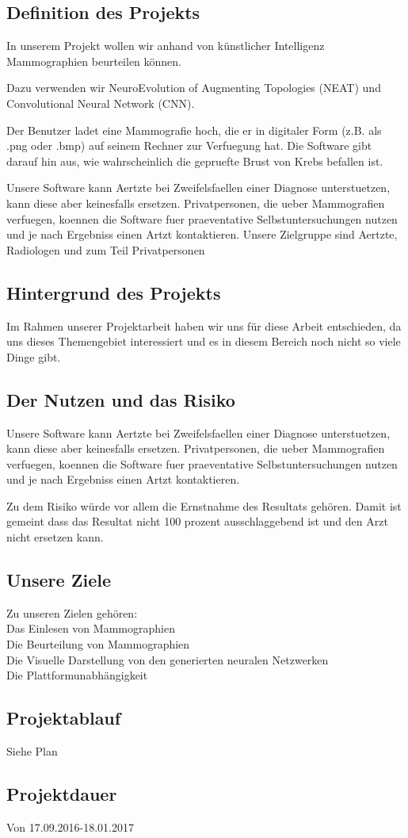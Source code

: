 \documentclass[11pt]{article}
\begin{document}
	\subsection{Definition des Projekts}
	In unserem Projekt wollen wir anhand von künstlicher Intelligenz Mammographien beurteilen können.
	
	Dazu verwenden wir NeuroEvolution of Augmenting Topologies (NEAT) und Convolutional Neural Network (CNN).
	
	Der Benutzer ladet eine Mammografie hoch, die er in digitaler Form (z.B. als
	.png oder .bmp) auf seinem Rechner zur Verfuegung hat. Die Software gibt
	darauf hin aus, wie wahrscheinlich die gepruefte Brust von Krebs befallen ist.
	
	Unsere Software kann Aertzte bei Zweifelsfaellen einer Diagnose unterstuetzen,
	kann diese aber keinesfalls ersetzen.
	Privatpersonen, die ueber Mammografien verfuegen, koennen die Software fuer
	praeventative Selbstuntersuchungen nutzen und je nach Ergebniss einen Artzt
	kontaktieren.
	Unsere Zielgruppe sind Aertzte, Radiologen und zum Teil Privatpersonen

	
	\subsection{Hintergrund des Projekts}
	Im Rahmen unserer Projektarbeit haben wir uns für diese Arbeit entschieden, da uns dieses Themengebiet interessiert und es in diesem Bereich noch nicht so viele Dinge gibt.

	\subsection{Der Nutzen und das Risiko}
	Unsere Software kann Aertzte bei Zweifelsfaellen einer Diagnose unterstuetzen,
	kann diese aber keinesfalls ersetzen.
	Privatpersonen, die ueber Mammografien verfuegen, koennen die Software fuer
	praeventative Selbstuntersuchungen nutzen und je nach Ergebniss einen Artzt
	kontaktieren.
	
	Zu dem Risiko würde vor allem die Ernstnahme des Resultats gehören. Damit ist gemeint dass das Resultat nicht 100 prozent ausschlaggebend ist und den Arzt nicht ersetzen kann.
	\subsection{Unsere Ziele}
	Zu unseren Zielen gehören:\\
		Das Einlesen von Mammographien\\
		Die Beurteilung von Mammographien\\
		Die Visuelle Darstellung von den generierten neuralen Netzwerken\\
		Die Plattformunabhängigkeit\\
	\subsection{Projektablauf}
	Siehe Plan
	\subsection{Projektdauer}
	Von 17.09.2016-18.01.2017
	
	
\end{document}
